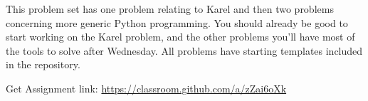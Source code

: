 \documentclass[letterpaper,12pt]{exam}
\begin{document}
This problem set has one problem relating to Karel and then two problems concerning more generic Python programming. You should already be good to start working on the Karel problem, and the other problems you'll have most of the tools to solve after Wednesday. All problems have starting templates included in the repository. 
	\begin{center}
		Get Assignment link: \url{https://classroom.github.com/a/zZai6oXk}
	\end{center}
\begin{questions}


\end{questions}
\end{document}
